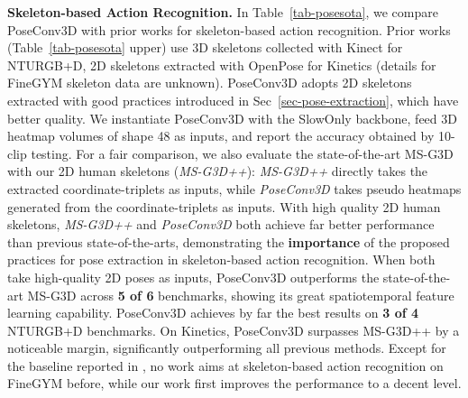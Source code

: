 \noindent\textbf{Skeleton-based Action Recognition. }
In Table~\ref{tab-posesota}, we compare PoseConv3D with prior works for skeleton-based action recognition. 
Prior works (Table~\ref{tab-posesota} upper) use 3D skeletons collected with Kinect for NTURGB+D, 
2D skeletons extracted with OpenPose for Kinetics 
(details for FineGYM skeleton data are unknown).
PoseConv3D adopts 2D skeletons extracted with good practices introduced in Sec~\ref{sec-pose-extraction}, which have better quality. 
We instantiate PoseConv3D with the SlowOnly backbone, feed 3D heatmap volumes of shape 48 as inputs, and report the accuracy obtained by 10-clip testing. 
For a fair comparison, we also evaluate the state-of-the-art MS-G3D with our 2D human skeletons (\emph{MS-G3D++}):
\emph{MS-G3D++} directly takes the extracted coordinate-triplets  as inputs, while \emph{PoseConv3D} takes pseudo heatmaps generated from the coordinate-triplets as inputs. 
With high quality 2D human skeletons, \emph{MS-G3D++} and \emph{PoseConv3D} both achieve far better performance than previous state-of-the-arts, 
demonstrating the \textbf{importance} of the proposed practices for pose extraction in skeleton-based action recognition. 
When both take high-quality 2D poses as inputs, PoseConv3D outperforms the state-of-the-art MS-G3D across \textbf{5 of 6} benchmarks, 
showing its great spatiotemporal feature learning capability. 
PoseConv3D achieves by far the best results on \textbf{3 of 4} NTURGB+D benchmarks. 
On Kinetics, PoseConv3D surpasses MS-G3D++ by a noticeable margin, significantly outperforming all previous methods. 
Except for the baseline reported in \cite{shao2020finegym}, no work aims at skeleton-based action recognition on FineGYM before,
while our work first improves the performance to a decent level.



